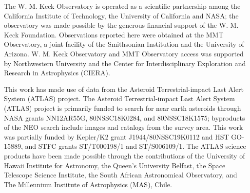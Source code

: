 \documentclass[twocolumn]{aastex631}
\begin{document}
\begin{CJK*}{UTF8}{gbsn}
The W. M. Keck Observatory is operated as a scientific partnership among the California Institute of Technology, the University of California and NASA; the observatory was made possible by the generous financial support of the W. M. Keck Foundation. Observations reported here were obtained at the MMT Observatory, a joint facility of the Smithsonian Institution and the University of Arizona. W. M. Keck Observatory and MMT Observatory access was supported by Northwestern University and the Center for Interdisciplinary Exploration and Research in Astrophysics (CIERA).

This work has made use of data from the Asteroid Terrestrial-impact Last Alert System (ATLAS) project. The Asteroid Terrestrial-impact Last Alert System (ATLAS) project is primarily funded to search for near earth asteroids through NASA grants NN12AR55G, 80NSSC18K0284, and 80NSSC18K1575; byproducts of the NEO search include images and catalogs from the survey area. This work was partially funded by Kepler/K2 grant J1944/80NSSC19K0112 and HST GO-15889, and STFC grants ST/T000198/1 and ST/S006109/1. The ATLAS science products have been made possible through the contributions of the University of Hawaii Institute for Astronomy, the Queen's University Belfast, the Space Telescope Science Institute, the South African Astronomical Observatory, and The Millennium Institute of Astrophysics (MAS), Chile.






\end{CJK*}
\end{document}
